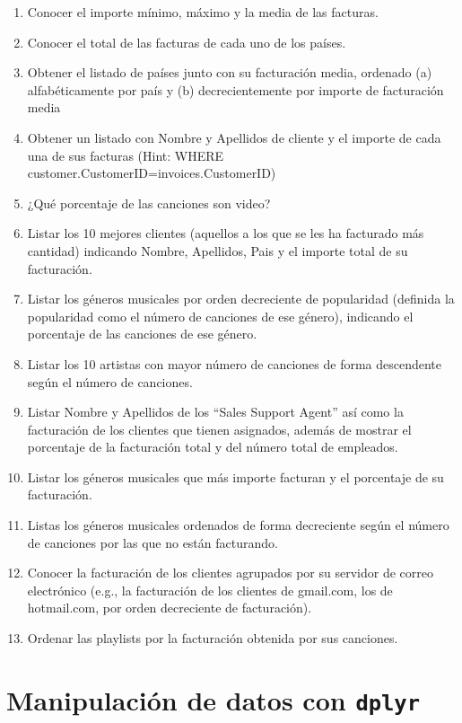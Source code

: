 \documentclass[]{book}
\begin{document}
\begin{enumerate}
\def\labelenumi{\arabic{enumi}.}
\item
  Conocer el importe mínimo, máximo y la media de las facturas.
\item
  Conocer el total de las facturas de cada uno de los países.
\item
  Obtener el listado de países junto con su facturación media, ordenado (a) alfabéticamente por país y (b) decrecientemente por importe de facturación media
\item
  Obtener un listado con Nombre y Apellidos de cliente y el importe de cada una de sus facturas (Hint: WHERE customer.CustomerID=invoices.CustomerID)
\item
  ¿Qué porcentaje de las canciones son video?
\item
  Listar los 10 mejores clientes (aquellos a los que se les ha facturado más cantidad) indicando Nombre, Apellidos, Pais y el importe total de su facturación.
\item
  Listar los géneros musicales por orden decreciente de popularidad (definida la popularidad como el número de canciones de ese género), indicando el porcentaje de las canciones de ese género.
\item
  Listar los 10 artistas con mayor número de canciones de forma descendente según el número de canciones.
\item
  Listar Nombre y Apellidos de los ``Sales Support Agent'' así como la facturación de los clientes que tienen asignados, además de mostrar el porcentaje de la facturación total y del número total de empleados.
\item
  Listar los géneros musicales que más importe facturan y el porcentaje de su facturación.
\item
  Listas los géneros musicales ordenados de forma decreciente según el número de canciones por las que no están facturando.
\item
  Conocer la facturación de los clientes agrupados por su servidor de correo electrónico (e.g., la facturación de los clientes de gmail.com, los de hotmail.com, por orden decreciente de facturación).
\item
  Ordenar las playlists por la facturación obtenida por sus canciones.
\end{enumerate}

\hypertarget{manipulacion-de-datos-con-dplyr}{%
\chapter{\texorpdfstring{Manipulación de datos con \texttt{dplyr}}{Manipulación de datos con dplyr}}\label{manipulacion-de-datos-con-dplyr}}
\end{document}
